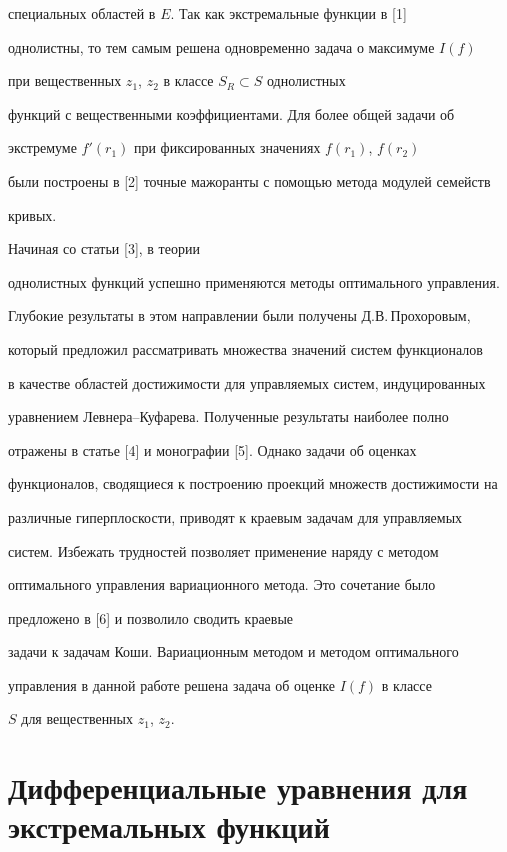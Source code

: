 специальных областей в $E$. Так как экстремальные функции в [1]


однолистны, то тем самым решена одновременно задача о максимуме $I(f)$


при вещественных $z_1$, $z_2$ в классе $S_R\subset S$ однолистных


функций с вещественными коэффициентами. Для более общей задачи об


экстремуме $f'(r_1)$ при фиксированных значениях $f(r_1)$, $f(r_2)$


были построены в [2] точные мажоранты с помощью метода модулей семейств


кривых.





Начиная со статьи [3], в теории


однолистных функций успешно применяются методы оптимального управления.


Глубокие результаты в этом направлении были получены Д.В.\,Про\-хо\-ро\-вым,


который предложил рассматривать множества значений систем функционалов


в качестве областей достижимости для управляемых систем, индуцированных


уравнением Левнера--Куфарева. Полученные результаты наиболее полно


отражены в статье [4] и монографии [5]. Однако задачи об оценках


функционалов, сводящиеся к построению проекций множеств достижимости на


различные гиперплоскости, приводят к краевым задачам для управляемых


систем. Избежать трудностей позволяет применение наряду с методом


оптимального управления вариационного метода. Это сочетание было


предложено в [6] и позволило сводить краевые


задачи к задачам Коши. Вариационным методом и методом оптимального


управления в данной работе решена задача об оценке $I(f)$ в классе


$S$ для вещественных $z_1$, $z_2$.





\section{Дифференциальные уравнения для экстремальных функций}





